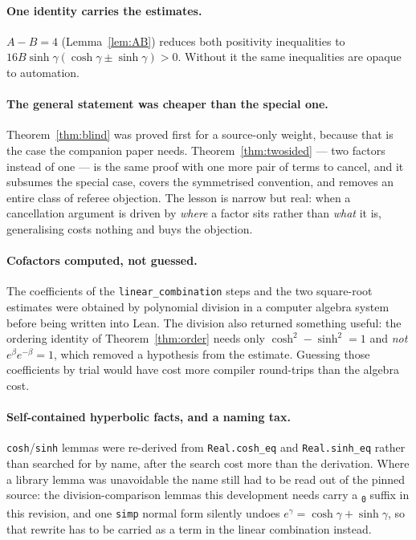 \documentclass[11pt]{article}
\theoremstyle{definition}
\begin{document}
\paragraph{One identity carries the estimates.}  $A-B=4$
(Lemma~\ref{lem:AB}) reduces both positivity inequalities to
$16B\sinh\gamma(\cosh\gamma\pm\sinh\gamma)>0$.  Without it the same
inequalities are opaque to automation.

\paragraph{The general statement was cheaper than the special one.}
Theorem~\ref{thm:blind} was proved first for a source-only weight, because that
is the case the companion paper needs.  Theorem~\ref{thm:twosided} --- two
factors instead of one --- is the same proof with one more pair of terms to
cancel, and it subsumes the special case, covers the symmetrised convention, and
removes an entire class of referee objection.  The lesson is narrow but real:
when a cancellation argument is driven by \emph{where} a factor sits rather than
\emph{what} it is, generalising costs nothing and buys the objection.

\paragraph{Cofactors computed, not guessed.}  The coefficients of the
\texttt{linear\_combination} steps and the two square-root estimates were
obtained by polynomial division in a computer algebra system before being
written into Lean.  The division also returned something useful: the ordering
identity of Theorem~\ref{thm:order} needs only $\cosh^2-\sinh^2=1$ and
\emph{not} $e^{\beta}e^{-\beta}=1$, which removed a hypothesis from the
estimate.  Guessing those coefficients by trial would have cost more compiler
round-trips than the algebra cost.

\paragraph{Self-contained hyperbolic facts, and a naming tax.}
\texttt{cosh}/\texttt{sinh} lemmas were re-derived from \texttt{Real.cosh\_eq}
and \texttt{Real.sinh\_eq} rather than searched for by name, after the search
cost more than the derivation.  Where a library lemma was unavoidable the name
still had to be read out of the pinned source: the division-comparison lemmas
this development needs carry a \texttt{\textsubscript{0}} suffix in this
revision, and one \texttt{simp} normal form silently undoes
$e^{\gamma}=\cosh\gamma+\sinh\gamma$, so that rewrite has to be carried as a
term in the linear combination instead.
\end{document}
